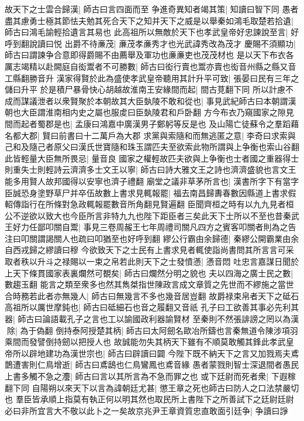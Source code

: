 故天下之士雲合歸漢|{
	師古曰言四面而至}
争進奇異知者竭其策|{
	知讀曰智下同}
愚者盡其慮勇士極其節怯夫勉其死合天下之知并天下之威是以舉秦如鴻毛取楚若拾遺|{
	師古曰鴻毛諭輕拾遺言其易也}
此高祖所以無敵於天下也孝武皇帝好忠諫說至言|{
	好呼到翻說讀曰悦}
出爵不待亷茂|{
	亷茂孝亷秀才也光武諱秀改為茂才}
慶賜不須顯功|{
	師古曰謂諫争合意即得爵賜不由薦舉及軍功也亷亷吏也茂茂材也}
是以天下布衣各厲志竭精以赴闕庭自衒鬻者不可勝數|{
	師古曰衒行賣也鬻亦賣也衒音州縣之縣又音工縣翻勝音升}
漢家得賢於此為盛使孝武皇帝聽用其計升平可致|{
	張晏曰民有三年之儲曰升平}
於是積尸暴骨快心胡越故淮南王安緣間而起|{
	間古莧翻下同}
所以計慮不成而謀議泄者以衆賢聚於本朝故其大臣埶陵不敢和從也|{
	事見武紀師古曰本朝謂漢朝也大臣謂淮南相内史之屬也服䖍曰臣埶陵君和戶卧翻}
方今布衣乃窺國家之隙見間而起者蜀郡是也|{
	孟康曰鴻嘉中廣漢男子鄭躬等反是也}
及山陽亡徒蘇令之羣蹈藉名都大郡|{
	賢曰前書曰十二萬戶為大郡}
求黨與索隨和而無逃匿之意|{
	李奇曰求索與己和及隨己者原父曰漢氏世寶隨和珠玉謂匹夫至欲索此物所謂與上争衡也索山谷翻}
此皆輕量大臣無所畏忌|{
	量音良}
國家之權輕故匹夫欲與上争衡也士者國之重器得士則重失士則輕詩云濟濟多士文王以寧|{
	師古曰詩大雅文王之詩也濟濟盛貌也言文王能多用賢人故邦國得以安寧也濟子禮翻}
廟堂之議非草茅所言也|{
	漢書所字下有當字}
臣誠恐身塗野草尸并卒伍故數上書求見輒報罷|{
	福去南昌歸夀春數因縣道上書求假軺傳詣行在所條對急政輒報罷數音所角翻見賢遍翻}
臣聞齊桓之時有以九九見者桓公不逆欲以致大也今臣所言非特九九也陛下距臣者三矣此天下士所以不至也昔秦武王好力任鄙叩關自鬻|{
	事見三卷周赧王七年周禮司關凡四方之賓客叩關者則為之告注曰叩關謂謁關人也疏曰叩猶至也好呼到翻}
繆公行霸由余歸德|{
	秦繆公開霸業由余自西戎歸之繆讀曰穆}
今欲致天下之士民有上書求見者輒使詣尚書問其所言言可采取者秩以升斗之禄賜以一束之帛若此則天下之士發憤懣|{
	懣音悶}
吐忠言嘉謀日聞於上天下條貫國家表裏爛然可覩矣|{
	師古曰爛然分明之貌也}
夫以四海之廣士民之數|{
	數趨玉翻}
能言之類至衆多也然其雋桀指世陳政言成文章質之先世而不繆施之當世合時務若此者亦無幾人|{
	師古曰無幾言不多也幾音居豈翻}
故爵禄束帛者天下之砥石高祖所以厲世摩鈍也|{
	師古曰砥細石也音之履翻又音祇}
孔子曰工欲善其事必先利其器|{
	師古曰論語載孔子之言也工以諭國政利器諭賢材}
至秦則不然張誹謗之罔以為漢除|{
	為于偽翻}
倒持泰阿授楚其柄|{
	師古曰太阿劒名歐冶所鑄也言秦無道令陳涉項羽乘間而發譬倒持劒以把授人也}
故誠能勿失其柄天下雖有不順莫敢觸其鋒此孝武皇帝所以辟地建功為漢世宗也|{
	師古曰辟讀曰闢}
今陛下既不納天下之言又加戮焉夫鳶鵲遭害則仁鳥增逝|{
	師古曰鳶鴟也仁鳥鸞鳳也鳶音緣}
愚者蒙戮則智士深退間者愚民上書多觸不急之灋|{
	師古曰言以其所言為不急而罪之也}
或下廷尉而死者衆|{
	下遐稼翻下同}
自陽朔以來天下以言為諱朝廷尤甚|{
	懲王章之死也師古曰防人之口法禁嚴切也}
羣臣皆承順上指莫有執正何以明其然也取民所上書陛下之所善試下之廷尉廷尉必曰非所宜言大不敬以此卜之一矣故京兆尹王章資質忠直敢面引廷争|{
	争讀曰諍}
